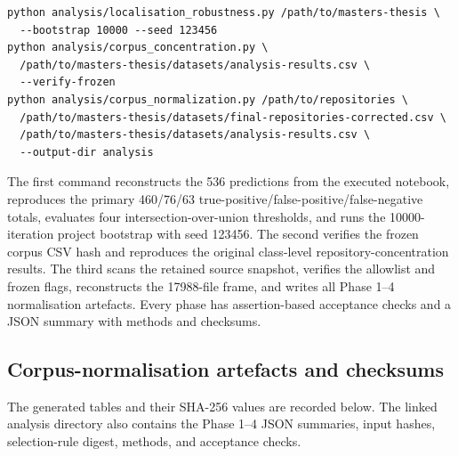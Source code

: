 \documentclass[a4paper,11pt]{article}
\begin{document}
\begin{lstlisting}[frame=single,basicstyle=\small\ttfamily]
python analysis/localisation_robustness.py /path/to/masters-thesis \
  --bootstrap 10000 --seed 123456
python analysis/corpus_concentration.py \
  /path/to/masters-thesis/datasets/analysis-results.csv \
  --verify-frozen
python analysis/corpus_normalization.py /path/to/repositories \
  /path/to/masters-thesis/datasets/final-repositories-corrected.csv \
  /path/to/masters-thesis/datasets/analysis-results.csv \
  --output-dir analysis
\end{lstlisting}

The first command reconstructs the \num{536} predictions from the executed notebook, reproduces the primary \num{460}/\num{76}/\num{63} true-positive/false-positive/false-negative totals, evaluates four intersection-over-union thresholds, and runs the \num{10000}-iteration project bootstrap with seed \num{123456}. The second verifies the frozen corpus CSV hash and reproduces the original class-level repository-concentration results. The third scans the retained source snapshot, verifies the allowlist and frozen flags, reconstructs the \num{17988}-file frame, and writes all Phase 1--4 normalisation artefacts. Every phase has assertion-based acceptance checks and a JSON summary with methods and checksums.

\subsection{Corpus-normalisation artefacts and checksums}

The generated tables and their SHA-256 values are recorded below. The linked analysis directory also contains the Phase 1--4 JSON summaries, input hashes, selection-rule digest, methods, and acceptance checks.
\end{document}

